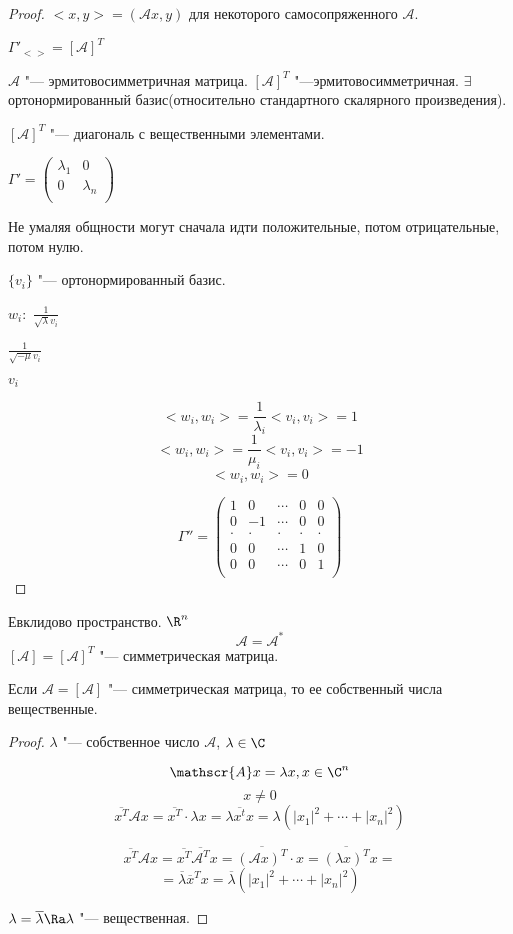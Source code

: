 \begin{proof}
$<x, y> = (\mathscr{A}x, y)$ для некоторого самосопряженного $\mathscr{A}$.

$\Gamma'_{<>} = [\mathscr{A}]^{T}$

$\mathscr{A}$ "--- эрмитовосимметричная матрица. 
$[\mathscr{A}]^T$ "---эрмитовосимметричная. 
$\exists$ ортонормированный базис(относительно стандартного скалярного произведения). 

$[\mathscr{A}]^{T}$ "--- диагональ с вещественными элементами. 

$\Gamma' = \begin{pmatrix}
\lambda_1&0\\
0&\lambda_n\\
\end{pmatrix}$ 

Не умаляя общности могут сначала идти положительные, потом отрицательные, потом нулю. 

$\{v_i\}$ "--- ортонормированный базис. 

$w_i:$
$\frac{1}{\sqrt{\lambda}v_i}$

$\frac{1}{\sqrt{-\mu}v_i}$

$v_i$ 

$$<w_i, w_i> = \frac{1}{\lambda_i} <v_i, v_i> = 1$$
$$<w_i, w_i> = \frac{1}{\mu_i} <v_i, v_i> = -1$$
$$<w_i,w_i> = 0 $$

$$\Gamma'' = \begin{pmatrix}
1&0&\cdots&0&0\\
0&-1&\cdots&0&0\\
\cdot &\cdot & \cdot& \cdot& \cdot\\
0&0&\cdots &1&0\\
0&0&\cdots &0&1\\
\end{pmatrix}$$

\end{proof}

Евклидово пространство. $\R^n$
$$\mathscr{A} = \mathscr{A}^*$$
$[\mathscr{A}] = [\mathscr{A}]^{T}$  "--- симметрическая матрица. 

\begin{lemma}{}
Если $\mathscr{A} = [\mathscr{A}]$ "--- симметрическая матрица, то ее собственный числа вещественные. 
\end{lemma}

\begin{proof}
$\lambda$ "--- собственное число $\mathscr{A}$, $\lambda \in \C$

$$\mathscr{A}x = \lambda x, x \in \C^n$$
$$x \ne 0$$
$$\overline{x^T} \mathscr{A}x  = \overline{x^T} \cdot \lambda x = \lambda \overline{x^t}x = \lambda(|x_1|^2 + \cdots + |x_n|^2)$$

$$\overline{x^T} \mathscr{A}x = \overline{x^{T}} \overline{\mathscr{A}^{T}}x = \overline{(\mathscr{A}x)^T} \cdot x  = \overline{(\lambda x)^T} x = $$
$$= \overline{\lambda}\overline{x}^Tx = \overline{\lambda}(|x_1|^2 + \cdots + |x_n|^2)$$

$\lambda = \overline{\lambda} \Ra \lambda$ "--- вещественная. 
\end{proof}
